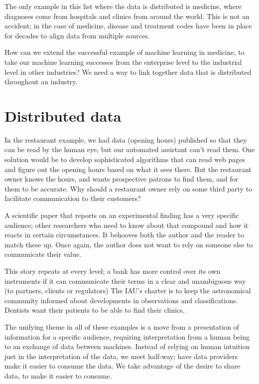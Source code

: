 The only example in this list where the data is distributed is medicine, where diagnoses come 
from hospitals and clinics from around the world.  This is not an accident; in the case of medicine, 
disease and treatment codes have been in place for decades to align data from multiple sources. 

How can we extend the successful example of machine learning in medicine, to take 
our machine learning successes from the enterprise level to the industrial level in other industries? 
We need a way to link together data that is distributed throughout an industry. 


\section{Distributed data}



In the restaurant example, we had data (opening hours) published so that they 
can be read by the human eye, but our automated assistant can't read them.  One solution 
would be to develop sophisticated algorithms that can read web pages and figure out
the opening hours based on what it sees there.  But the restaurant owner knows the hours, 
and wants prospective patrons to find them, and for them to be accurate.  Why should 
a restaurant owner rely on some third party to facilitate communication to their customers?  

A scientific paper that reports on an experimental finding has a very specific audience;
other researchers who need to know about that compound and how it reacts in certain circumstances. 
It behooves both the author and the reader to match these up.  Once again, the author does not
want to rely on someone else to communicate their value. 

This story repeats at every level; a bank has more control over its own instruments if it 
can communicate their terms in a clear and unambiguous way (to partners, clients or regulators)
The IAU's charter is to keep the astronomical community informed about developments in 
observations and classifications.  Dentists want their patients to be able to find their clinics. 

The unifying theme in all of these examples is a move from a presentation of information 
for a specific audience, requiring interpretation from a human being to an exchange of data
between machines.  Instead of relying on human intuition just in the interpretation of the
data, we meet half-way; have data providers make it easier to consume the data.  We take advantage of 
the desire to share data, to make it easier to consume. 

